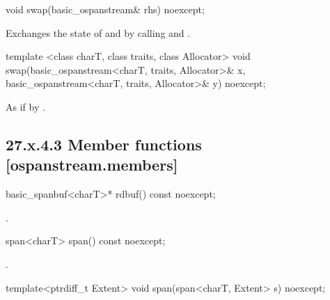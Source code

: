 \documentclass[ebook,11pt,article]{memoir}
\begin{document}
\begin{itemdecl}
void swap(basic_ospanstream& rhs) noexcept;
\end{itemdecl}

\begin{itemdescr}
\pnum
\effects Exchanges the state of  and
 by calling
 and
.
\end{itemdescr}


\begin{itemdecl}
template <class charT, class traits, class Allocator>
  void swap(basic_ospanstream<charT, traits, Allocator>& x,
            basic_ospanstream<charT, traits, Allocator>& y) noexcept;
\end{itemdecl}

\begin{itemdescr}
\pnum
\effects As if by .
\end{itemdescr}

\subsection{27.x.4.3 Member functions [ospanstream.members]}
\label{ospanstream.members}

\begin{itemdecl}
basic_spanbuf<charT>* rdbuf() const noexcept;
\end{itemdecl}

\begin{itemdescr}
\pnum
\returns
{}.
\end{itemdescr}

\begin{itemdecl}
span<charT> span() const noexcept;
\end{itemdecl}

\begin{itemdescr}
\pnum
\returns
{}.
\end{itemdescr}

\begin{itemdecl}
template<ptrdiff_t Extent>
void span(span<charT, Extent> s) noexcept;
\end{itemdecl}
\end{document}

